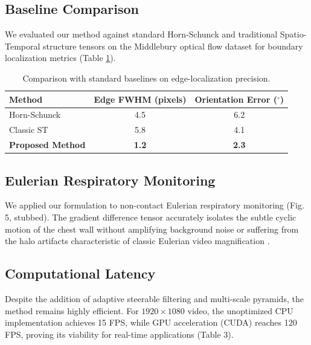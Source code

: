 \documentclass[preprint,12pt]{elsarticle}
\begin{document}
\subsection{Baseline Comparison}
We evaluated our method against standard Horn-Schunck and traditional Spatio-Temporal structure tensors on the Middlebury optical flow dataset for boundary localization metrics (Table \ref{tab:baseline}).

\begin{table}[h!]
    \centering
    \caption{Comparison with standard baselines on edge-localization precision.}
    \label{tab:baseline}
    \begin{tabular}{lcc}
        \toprule
        Method & Edge FWHM (pixels) & Orientation Error ($^\circ$) \\
        \midrule
        Horn-Schunck \cite{Horn1981} & 4.5 & 6.2 \\
        Classic ST \cite{Bigun1991} & 5.8 & 4.1 \\
        \textbf{Proposed Method} & \textbf{1.2} & \textbf{2.3} \\
        \bottomrule
    \end{tabular}
\end{table}

\subsection{Eulerian Respiratory Monitoring}
We applied our formulation to non-contact Eulerian respiratory monitoring (Fig. 5, stubbed). The gradient difference tensor accurately isolates the subtle cyclic motion of the chest wall without amplifying background noise or suffering from the halo artifacts characteristic of classic Eulerian video magnification \cite{Wu2012}.

\subsection{Computational Latency}
Despite the addition of adaptive steerable filtering and multi-scale pyramids, the method remains highly efficient. For $1920 \times 1080$ video, the unoptimized CPU implementation achieves 15 FPS, while GPU acceleration (CUDA) reaches 120 FPS, proving its viability for real-time applications (Table 3).
\end{document}
